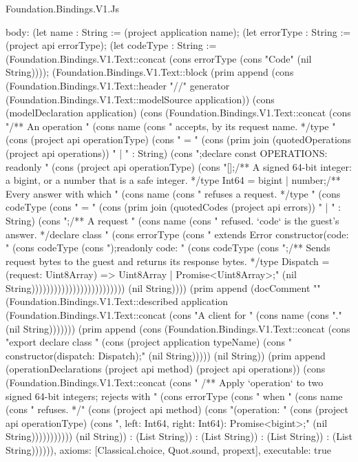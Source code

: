 \begin{lexlean}{Foundation.Bindings.V1.Js}
\begin{semanticmodule}
{  body: (let name : String := (project application name); (let errorType : String := (project api errorType); (let codeType : String := (Foundation.Bindings.V1.Text::concat (cons errorType (cons "Code" (nil String)))); (Foundation.Bindings.V1.Text::block (prim append (cons (Foundation.Bindings.V1.Text::header "//" generator (Foundation.Bindings.V1.Text::modelSource application)) (cons (modelDeclaration application) (cons (Foundation.Bindings.V1.Text::concat (cons "\n/** An operation " (cons name (cons " accepts, by its request name. */\nexport type " (cons (project api operationType) (cons " = " (cons (prim join (quotedOperations (project api operations)) " | " : String) (cons ";\nexport declare const OPERATIONS: readonly " (cons (project api operationType) (cons "[];\n\n/** A signed 64-bit integer: a bigint, or a number that is a safe integer. */\nexport type Int64 = bigint | number;\n\n/** Every answer with which " (cons name (cons " refuses a request. */\nexport type " (cons codeType (cons " = " (cons (prim join (quotedCodes (project api errors)) " | " : String) (cons ";\n\n/** A request " (cons name (cons " refused. `code` is the guest's answer. */\nexport declare class " (cons errorType (cons " extends Error {\n  constructor(code: " (cons codeType (cons ");\n  readonly code: " (cons codeType (cons ";\n}\n\n/** Sends request bytes to the guest and returns its response bytes. */\nexport type Dispatch = (request: Uint8Array) => Uint8Array | Promise<Uint8Array>;\n" (nil String))))))))))))))))))))))))) (nil String)))) (prim append (docComment "" (Foundation.Bindings.V1.Text::described application (Foundation.Bindings.V1.Text::concat (cons "A client for " (cons name (cons "." (nil String))))))) (prim append (cons (Foundation.Bindings.V1.Text::concat (cons "export declare class " (cons (project application typeName) (cons " {\n  constructor(dispatch: Dispatch);" (nil String))))) (nil String)) (prim append (operationDeclarations (project api method) (project api operations)) (cons (Foundation.Bindings.V1.Text::concat (cons "  /** Apply `operation` to two signed 64-bit integers; rejects with " (cons errorType (cons " when " (cons name (cons " refuses. */\n  " (cons (project api method) (cons "(operation: " (cons (project api operationType) (cons ", left: Int64, right: Int64): Promise<bigint>;\n}" (nil String))))))))))) (nil String)) : (List String)) : (List String)) : (List String)) : (List String)))))),
  axioms: [Classical.choice, Quot.sound, propext],
  executable: true
}


\end{semanticmodule}
\end{lexlean}

